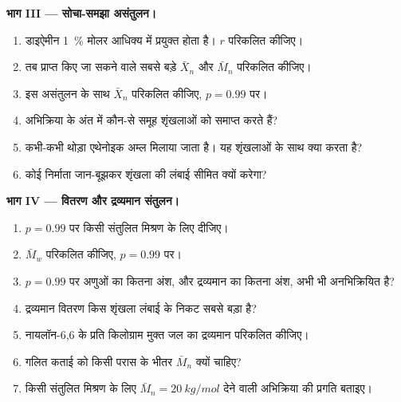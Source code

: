 \begin{problem}
\medskip
\noindent\textbf{भाग III --- सोचा-समझा असंतुलन।}
\begin{enumerate}[resume]
  \item डाइऐमीन 1~\% मोलर आधिक्य में प्रयुक्त होता है। $r$ परिकलित कीजिए।
  \item तब प्राप्त किए जा सकने वाले सबसे बड़े $\bar X_n$ और $\bar M_n$ परिकलित कीजिए।
  \item इस असंतुलन के साथ $\bar X_n$ परिकलित कीजिए, $p = 0.99$ पर।
  \item अभिक्रिया के अंत में कौन-से समूह शृंखलाओं को समाप्त करते हैं?
  \item कभी-कभी थोड़ा एथेनोइक अम्ल मिलाया जाता है। यह शृंखलाओं के साथ क्या करता है?
  \item कोई निर्माता जान-बूझकर शृंखला की लंबाई सीमित क्यों करेगा?
\end{enumerate}

\medskip
\noindent\textbf{भाग IV --- वितरण और द्रव्यमान संतुलन।}
\begin{enumerate}[resume]
  \item $p = 0.99$ पर किसी संतुलित मिश्रण के लिए  दीजिए।
  \item $\bar M_w$ परिकलित कीजिए, $p = 0.99$ पर।
  \item $p = 0.99$ पर अणुओं का कितना अंश, और द्रव्यमान का कितना अंश, अभी भी
        अनभिक्रियित  है?
  \item द्रव्यमान वितरण किस शृंखला लंबाई के निकट सबसे बड़ा है?
  \item नायलॉन-6,6 के प्रति किलोग्राम मुक्त जल का द्रव्यमान परिकलित कीजिए।
  \item गलित कताई को किसी परास के भीतर $\bar M_n$ क्यों चाहिए?
  \item किसी संतुलित मिश्रण के लिए $\bar M_n = \qty{20}{kg/mol}$ देने वाली अभिक्रिया की प्रगति बताइए।
\end{enumerate}
\end{problem}
